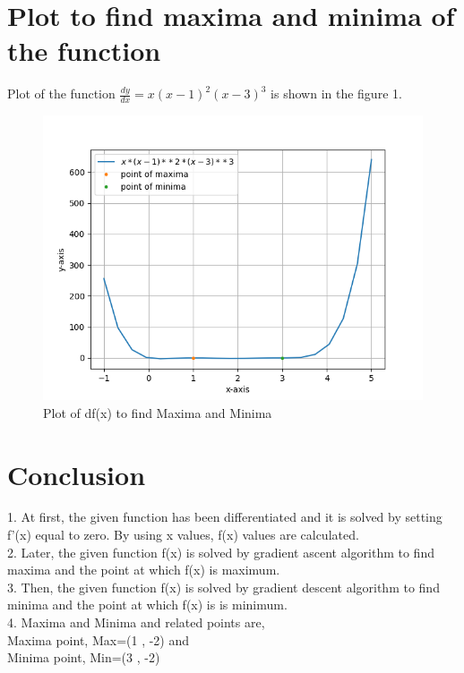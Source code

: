 \documentclass[10pt,twocolumn]{article}
\begin{document}
\section{Plot to find maxima and minima of the function}
\vspace{0.25cm}
Plot of the function $\frac{dy}{dx} = x(x-1)^2(x-3)^3$ is shown in the figure 1.
\begin{figure}[h]
\includegraphics[width=1\columnwidth]{opt.png}
\caption{Plot of df(x) to find Maxima and Minima}
\label{Optimization of Machince A and B}
\end{figure}

\section{Conclusion}
\begin{flushleft}
1. At first, the given function has been differentiated and it is solved by setting f'(x) equal to zero. By using x values, f(x) values are calculated.\\
\vspace{0.25cm}
2. Later, the given function f(x) is solved by gradient ascent algorithm to find maxima and the point at which f(x) is maximum.\\
\vspace{0.25cm}
3. Then, the given function f(x) is solved by gradient descent algorithm to find minima and the point at which f(x) is is minimum.\\
\vspace{0.25cm}
4. Maxima and Minima and related points are, \\
\vspace{0.25cm}
\center
Maxima point, Max=(1 , -2) and\\ 
\vspace{0.2cm}
Minima point, Min=(3 , -2)
\end{flushleft}
\endcenter
\end{document}
